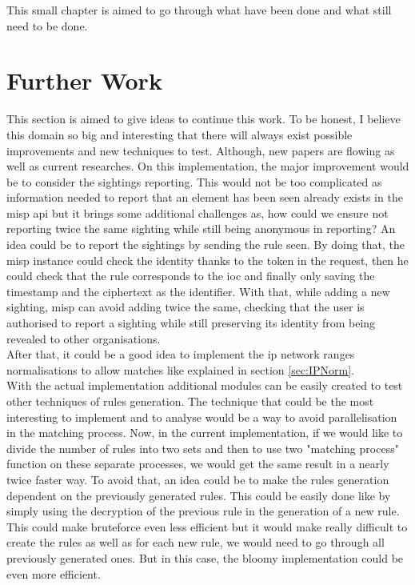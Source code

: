 \documentclass{eplmastersthesis}
\begin{document}
This small chapter is aimed to go through what have been done and what still need to be done.

\section{Further Work}
This section is aimed to give ideas to continue this work. To be honest, I believe this domain so big and interesting that there will always exist possible improvements and new techniques to test. Although, new papers are flowing as well as current researches.
On this implementation, the major improvement would be to consider the sightings reporting. This would not be too complicated as information needed to report that an element has been seen already exists in the \gls{misp} \gls{api} but it brings some additional challenges as, how could we ensure not reporting twice the same sighting while still being anonymous in reporting?
An idea could be to report the sightings by sending the rule seen. By doing that, the \gls{misp} instance could check the identity thanks to the token in the request, then he could check that the rule corresponds to the \gls{ioc} and finally only saving the timestamp and the ciphertext as the identifier.
With that, while adding a new sighting, \gls{misp} can avoid adding twice the same, checking that the user is authorised to report a sighting while still preserving its identity from being revealed to other organisations.\\

After that, it could be a good idea to implement the \gls{ip} network ranges normalisations to allow matches like explained in section \ref{sec:IPNorm}.\\

With the actual implementation additional modules can be easily created to test other techniques of rules generation. The technique that could be the most interesting to implement and to analyse would be a way to avoid parallelisation in the matching process.
Now, in the current implementation, if we would like to divide the number of rules into two sets and then to use two "matching process" function on these separate processes, we would get the same result in a nearly twice faster way. To avoid that, an idea could be to make the rules generation dependent on the previously generated rules. This could be easily done like by simply using the decryption of the previous rule in the generation of a new rule.
This could make bruteforce even less efficient but it would make really difficult to create the rules as well as for each new rule, we would need to go through all previously generated ones.
But in this case, the bloomy implementation could be even more efficient.\\
\end{document}

